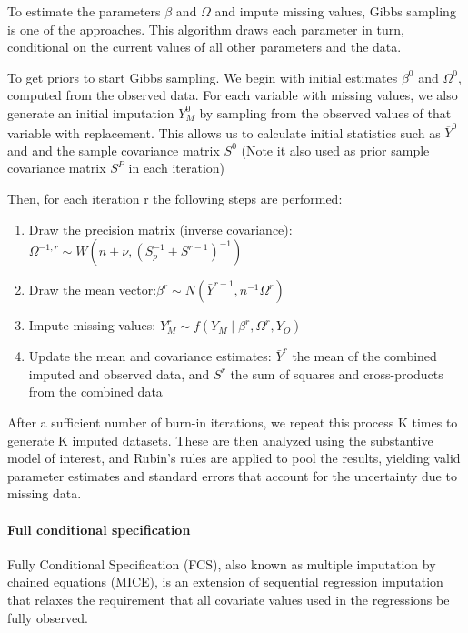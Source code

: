 \documentclass{article}
\begin{document}
To estimate the parameters \(\beta\) and \(\Omega\) and impute missing
values, Gibbs sampling is one of the approaches. This algorithm draws
each parameter in turn, conditional on the current values of all other
parameters and the data.

To get priors to start Gibbs sampling. We begin with initial estimates
\(\beta^{0}\) and \(\Omega^{0}\), computed from the observed data. For
each variable with missing values, we also generate an initial
imputation \(Y_{M}^{0}\) by sampling from the observed values of that
variable with replacement. This allows us to calculate initial
statistics such as \(\overline{Y}^{0}\) and and the sample covariance
matrix \(S^{0}\) (Note it also used as prior sample covariance matrix
\(S^{P}\) in each iteration)

Then, for each iteration r the following steps are performed:

\begin{enumerate}
\def\labelenumi{\arabic{enumi}.}
\item
  Draw the precision matrix (inverse
  covariance):\(\Omega^{-1,r} \sim W(n + \nu, (S_p^{-1} + S^{r-1})^{-1})\)
\item
  Draw the mean
  vector:\(\beta^{r} \sim N(\bar{Y}^{r-1}, n^{-1} \Omega^r)\)
\item
  Impute missing values:
  \(Y_{M}^{r} \sim f(Y_{M} \mid \beta^{r}, \Omega^{r}, Y_{O})\)
\item
  Update the mean and covariance estimates: \(\bar{Y}^{r}\) the mean of
  the combined imputed and observed data, and \(S^{r}\) the sum of
  squares and cross-products from the combined data
\end{enumerate}

After a sufficient number of burn-in iterations, we repeat this process
K times to generate K imputed datasets. These are then analyzed using
the substantive model of interest, and Rubin's rules are applied to pool
the results, yielding valid parameter estimates and standard errors that
account for the uncertainty due to missing data.

\paragraph{Full conditional
specification}\label{full-conditional-specification}

Fully Conditional Specification (FCS), also known as multiple imputation
by chained equations (MICE), is an extension of sequential regression
imputation that relaxes the requirement that all covariate values used
in the regressions be fully observed.
\end{document}
